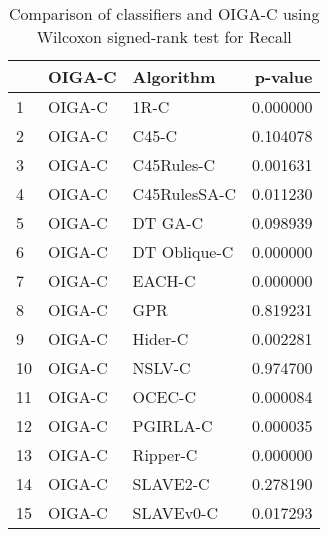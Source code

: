 \begin{table}
\footnotesize
\caption{Comparison of classifiers and OIGA-C using Wilcoxon signed-rank test for Recall}
\label{tab:OIGA-C wilcoxon Recall comparison}
\begin{tabular}{lllr}
\hline
 & OIGA-C & Algorithm & p-value \\
\hline
1 & OIGA-C & 1R-C & 0.000000 \\
2 & OIGA-C & C45-C & 0.104078 \\
3 & OIGA-C & C45Rules-C & 0.001631 \\
4 & OIGA-C & C45RulesSA-C & 0.011230 \\
5 & OIGA-C & DT GA-C & 0.098939 \\
6 & OIGA-C & DT Oblique-C & 0.000000 \\
7 & OIGA-C & EACH-C & 0.000000 \\
8 & OIGA-C & GPR & 0.819231 \\
9 & OIGA-C & Hider-C & 0.002281 \\
10 & OIGA-C & NSLV-C & 0.974700 \\
11 & OIGA-C & OCEC-C & 0.000084 \\
12 & OIGA-C & PGIRLA-C & 0.000035 \\
13 & OIGA-C & Ripper-C & 0.000000 \\
14 & OIGA-C & SLAVE2-C & 0.278190 \\
15 & OIGA-C & SLAVEv0-C & 0.017293 \\
\hline
\end{tabular}
\end{table}
